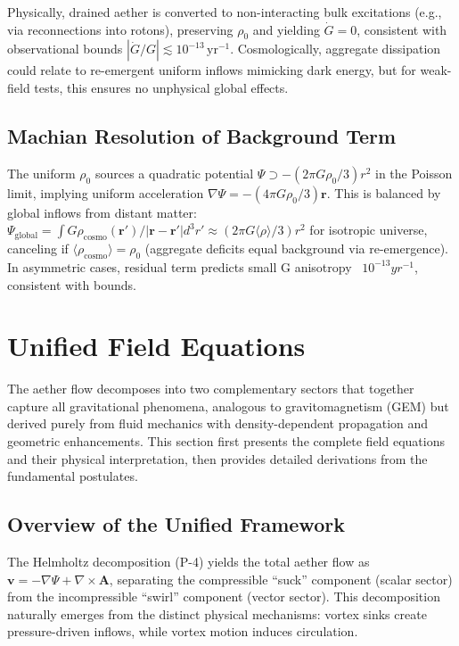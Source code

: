 \documentclass{article}
\begin{document}
Physically, drained aether is converted to non-interacting bulk excitations (e.g., via reconnections into rotons), preserving $\rho_0$ and yielding $\dot{G} = 0$, consistent with observational bounds $|\dot{G}/G| \lesssim 10^{-13} \, \mathrm{yr}^{-1}$. Cosmologically, aggregate dissipation could relate to re-emergent uniform inflows mimicking dark energy, but for weak-field tests, this ensures no unphysical global effects.

\subsection{Machian Resolution of Background Term}

The uniform $\rho_0$ sources a quadratic potential $\Psi \supset - (2\pi G \rho_0 / 3) r^2$ in the Poisson limit, implying uniform acceleration $\nabla \Psi = - (4\pi G \rho_0 / 3) \mathbf{r}$. This is balanced by global inflows from distant matter: $\Psi_{\text{global}} = \int G \rho_{\text{cosmo}}(\mathbf{r}') / |\mathbf{r} - \mathbf{r}'| d^3 r' \approx (2\pi G \langle \rho \rangle / 3) r^2$ for isotropic universe, canceling if $\langle \rho_{\text{cosmo}} \rangle = \rho_0$ (aggregate deficits equal background via re-emergence). In asymmetric cases, residual term predicts small G anisotropy ~$10^{-13} yr^{-1}$, consistent with bounds.

\section{Unified Field Equations}

The aether flow decomposes into two complementary sectors that together capture all gravitational phenomena, analogous to gravitomagnetism (GEM) but derived purely from fluid mechanics with density-dependent propagation and geometric enhancements. This section first presents the complete field equations and their physical interpretation, then provides detailed derivations from the fundamental postulates.

\subsection{Overview of the Unified Framework}

The Helmholtz decomposition (P-4) yields the total aether flow as $\mathbf{v} = -\nabla \Psi + \nabla \times \mathbf{A}$, separating the compressible ``suck'' component (scalar sector) from the incompressible ``swirl'' component (vector sector). This decomposition naturally emerges from the distinct physical mechanisms: vortex sinks create pressure-driven inflows, while vortex motion induces circulation.
\end{document}
